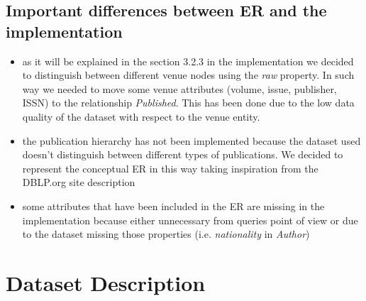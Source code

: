 \documentclass{Configuration_Files/PoliMi3i_thesis}
\begin{document}
\section{Important differences between ER and the implementation}
\begin{itemize}
    \item as it will be explained in the section 3.2.3 in the implementation we decided to distinguish between different venue
            nodes using the \emph{raw} property. In such way we needed to move some venue attributes (volume, issue, publisher, ISSN)
            to the relationship \emph{Published}. This has been done due to the low data quality of the dataset with respect to the venue entity.
    \item the publication hierarchy has not been implemented because the dataset used doesn't distinguish between different types of
            publications. We decided to represent the conceptual ER in this way taking inspiration from the DBLP.org site description
    \item some attributes that have been included in the ER are missing in the implementation because either unnecessary from queries
            point of view or due to the dataset missing those properties (i.e. \emph{nationality} in \emph{Author})
\end{itemize}

\chapter{Dataset Description}
\end{document}
